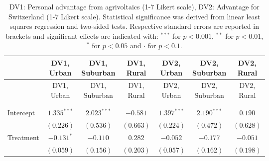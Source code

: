 
\begin{center}
\begin{small}
\begin{longtable}{l@{} c@{} c@{} c@{} c@{} c@{} c@{}}
\hline
 & \shortstack{\rule{0pt}{2.2ex}DV1,\\Urban} & \shortstack{\rule{0pt}{2.2ex}DV1,\\Suburban} & \shortstack{\rule{0pt}{2.2ex}DV1,\\Rural} & \shortstack{\rule{0pt}{2.2ex}DV2,\\Urban} & \shortstack{\rule{0pt}{2.2ex}DV2,\\Suburban} & \shortstack{\rule{0pt}{2.2ex}DV2,\\Rural} \\
\hline
\endfirsthead
\hline
 & \shortstack{\rule{0pt}{2.2ex}DV1,\\Urban} & \shortstack{\rule{0pt}{2.2ex}DV1,\\Suburban} & \shortstack{\rule{0pt}{2.2ex}DV1,\\Rural} & \shortstack{\rule{0pt}{2.2ex}DV2,\\Urban} & \shortstack{\rule{0pt}{2.2ex}DV2,\\Suburban} & \shortstack{\rule{0pt}{2.2ex}DV2,\\Rural} \\
\hline
\endhead
\hline
\endfoot
\hline
\multicolumn{7}{l}{\tiny{
}}\\
\caption{DV1: Personal advantage from agrivoltaics (1-7 Likert scale), DV2: Advantage for Switzerland (1-7 Likert scale). Statistical significance was derived from linear least squares regression and two-sided tests. Respective standard errors are reported in brackets and significant effects are indicated with: $^{***}$ for $p < 0.001$, $^{**}$ for $p < 0.01$, $^*$ for $p < 0.05$ and $\cdot$ for $p < 0.1$.}
\label{table:coefficients}
\endlastfoot \\
Intercept                           & $1.335^{***}$    & $2.023^{***}$ & $-0.581$      & $1.397^{***}$   & $2.190^{***}$  & $0.190$        \\
                                    & $(0.226)$        & $(0.536)$     & $(0.663)$     & $(0.224)$       & $(0.472)$      & $(0.628)$      \\
Treatment                           & $-0.131^{*}$     & $-0.110$      & $0.282$       & $-0.052$        & $-0.177$       & $-0.051$       \\
                                    & $(0.059)$        & $(0.156)$     & $(0.203)$     & $(0.057)$       & $(0.162)$      & $(0.198)$      \\

\end{longtable}
\end{small}
\end{center}
